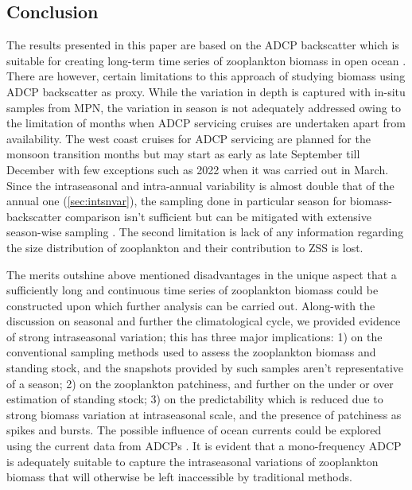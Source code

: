 \documentclass{article}
\begin{document}
	\subsection{Conclusion}
	The results presented in this paper are based on the ADCP backscatter which is suitable for creating long-term time series of zooplankton biomass in open ocean \citep{jiang2007temporal,hobbs2021marine,ursella2021diel,aparna2022seasonal}. There are however, certain limitations to this approach of studying biomass using ADCP backscatter as proxy. While the variation in depth is captured with in-situ samples from MPN, the variation in season is not adequately addressed owing to the limitation of months when ADCP servicing cruises are undertaken apart from availability. The west coast cruises for ADCP servicing are planned for the monsoon transition months but may start as early as late September till December with few exceptions such as 2022 when it was carried out in March. Since the intraseasonal and intra-annual variability is almost double that of the annual one (\cref{sec:intsnvar}), the sampling done in particular season for biomass-backscatter comparison isn't sufficient but can be mitigated with extensive season-wise sampling \citep{jadhav2024abundance}. The second limitation is lack of any information regarding the size distribution of zooplankton and their contribution to ZSS is lost. 
	
	The merits outshine above mentioned disadvantages in the unique aspect that a sufficiently long and continuous time series of zooplankton biomass could be constructed upon which further analysis can be carried out. Along-with the discussion on seasonal and further the climatological cycle, we provided evidence of strong intraseasonal variation; this has three major implications: 1) on the conventional sampling methods used to assess the zooplankton biomass and standing stock, and the snapshots provided by such samples aren't representative of a season; 2) on the zooplankton patchiness, and further on the under or over estimation of standing stock; 3) on the predictability which is reduced due to strong biomass variation at intraseasonal scale, and the presence of patchiness as spikes and bursts. The possible influence of ocean currents could be explored using the current data from ADCPs \citep{hitchcock2002zooplankton,lawson2004acoustically}. It is evident that a mono-frequency ADCP is adequately suitable to capture the intraseasonal variations of  zooplankton biomass that will otherwise be left inaccessible by traditional methods. 
	
\end{document}
